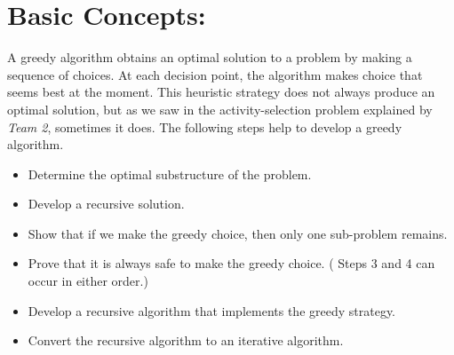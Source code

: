 \section{Basic Concepts:}

A greedy algorithm obtains an optimal solution to a problem by making a sequence of choices. At each decision point, the algorithm makes choice that seems best at the moment. This heuristic strategy does not always produce an optimal solution, but as we saw in the activity-selection problem explained by {\itshape Team 2}, sometimes it does. The following steps help to develop a greedy algorithm.

\begin{itemize}
\item Determine the optimal substructure of the problem.
\item Develop a recursive solution.
\item Show that if we make the greedy choice, then only one sub-problem remains.
\item Prove that it is always safe to make the greedy choice. ( Steps 3 and 4 can occur in either order.)
\item Develop a recursive algorithm that implements the greedy strategy.
\item Convert the recursive algorithm to an iterative algorithm.
\end{itemize}

\pagebreak